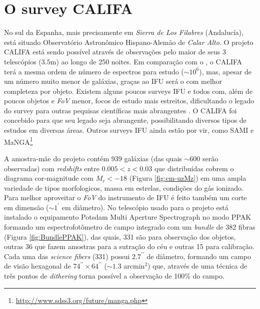 
\section{O survey CALIFA}
\label{sec:CALePyC:Apresent}

No sul da Espanha, mais precisamente em {\em Sierra de Los Filabres} (Andalucía), está situado Observatório Astronômico
Hispano-Alemão de {\em Calar Alto}. O projeto CALIFA está sendo possível através de observações pelo maior de seus 3
telescópios ($3.5$m) ao longo de 250 noites. Em comparação com o \SDSS, o CALIFA terá a mesma ordem de número de
espectros para estudo ($\sim 10^6$), mas, apesar de um número muito menor de galáxias, graças ao IFU será o com melhor
completeza por objeto. Existem alguns poucos surveys IFU e todos com, além de poucos objetos e {\em FoV} menor, focos de
estudo mais estreitos, dificultando o legado do survey para outras pequisas científicas mais abrangentes \citep[SAURON;
][região central de 72 galáxias com $z < 0.01$.]{de-Zeeuw2002} \citep[PINGS; ][algumas galáxias muito próximas ($\sim
10$ Mpc) e o estudo atual de 70 (U)LIRGs com $z <0.26$]{RosalesOrtega2010} \citep[VENGA; ][$30$ galáxias
espirais]{Blanc2010}. O CALIFA foi concebido para que seu legado seja abrangente, possibilitando diversos tipos de
estudos em diversas áreas. Outros surveys IFU ainda estão por vir, como SAMI \citep{Croom2012} e
MaNGA\footnote{\url{http://www.sdss3.org/future/manga.php}}

A amostra-mãe do projeto contém 939 galáxias (das quais $\sim 600$ serão observadas) com {\em redshifts} entre $0.005 <
z < 0.03$ que distribuídas cobrem o diagrama cor-magnitude com $M_r < -18$ (Figura \ref{fig:cm-uzMz}) em uma ampla
variedade de tipos morfologicos, massa em estrelas, condições do gás ionizado. Para melhor aproveitar o {\em FoV} do
instrumento de IFU é feito também um corte em dimensão ($\sim1^{\prime}$ em diâmetro). No telescópio usado para o
projeto está instalado o equipamento Potsdam Multi Aperture Spectrograph \citep[PMAS; ][]{Roth2005} no modo PPAK
\citep{Verheijen2004, Kelz2006} formando um espectrofotômetro de campo integrado com um {\em bundle} de 382 fibras
(Figura \ref{fig:BundlePPAK}), das quais, 331 são para observação dos objetos, outras 36 que fazem amostras para a
sutração do céu e outras 15 para calibração. Cada uma das {\em science fibers} (331) possui $2.7^{\prime\prime}$ de
diâmetro, formando um campo de visão hexagonal de $74^{\prime\prime} \times 64^{\prime\prime}$ ($\sim1.3$ arcmin$^2$)
que, através de uma técnica de três pontos de {\em dithering} torna possível a observação de 100\% do campo.

